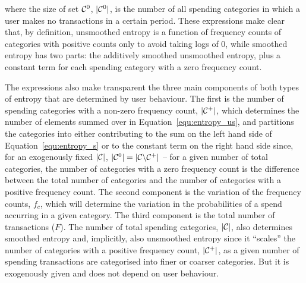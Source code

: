 \noindent where the size of set $\mathcal{C}^{0}$, $|\mathcal{C}^{0}|$, is the number of all
spending categories in which a user makes no transactions in a certain period.
These expressions make clear that, by definition, unsmoothed entropy is a
function of frequency counts of categories with positive counts only to avoid
taking logs of 0, while smoothed entropy has two parts: the additively smoothed
unsmoothed entropy, plus a constant term for each spending category with a zero
frequency count.

The expressions also make transparent the three main components of both types
of entropy that are determined by user behaviour. The first is the number of
spending categories with a non-zero frequency count, $|\mathcal{C}^{+}|$, which
determines the number of elements summed over in Equation~\ref{equ:entropy_us},
and partitions the categories into either contributing to the sum on the left
hand side of Equation~\ref{equ:entropy_s} or to the constant term on the right
hand side since, for an exogenously fixed $|\mathcal{C}|$, $|\mathcal{C}^{0}| = |\mathcal{C}
\backslash \mathcal{C}^{+}|$ -- for a given number of total categories, the number of
categories with a zero frequency count is the difference between the total
number of categories and the number of categories with a positive frequency
count. The second component is the variation of the frequency counts, $f_c$,
which will determine the variation in the probabilities of a spend accurring in
a given category. The third component is the total number of transactions
($F$). The number of total spending categories, $|\mathcal{C}|$, also determines
smoothed entropy and, implicitly, also unsmoothed entropy since it ``scales''
the number of categories with a positive frequency count, $|\mathcal{C}^{+}|$, as a
given number of spending transactions are categorised into finer or coarser
categories. But it is exogenously given and does not depend on user behaviour.


